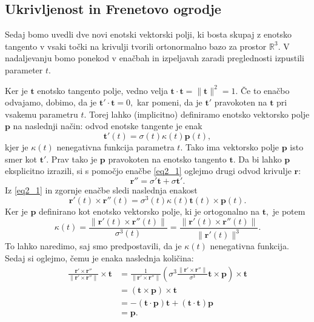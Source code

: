 \documentclass[12pt,a4paper,twoside]{article}
\theoremstyle{definition} %
\theoremstyle{plain} %
\theoremstyle{primerstyle}
\numberwithin{equation}{section}  %
\newcommand{\R}{\mathbb R}
\newcommand{\tV}{\mathbf{t}}
\newcommand{\pV}{\mathbf{p}}
\newcommand{\rV}{\mathbf{r}}
\begin{document}
\subsection{Ukrivljenost in Frenetovo ogrodje}

Sedaj bomo uvedli dve novi enotski vektorski polji, ki bosta skupaj z enotsko tangento v vsaki točki na krivulji tvorili ortonormalno bazo za prostor $\R^3.$ V nadaljevanju bomo ponekod v enačbah in izpeljavah zaradi preglednosti izpustili parameter $t.$

Ker je $\tV$ enotsko tangento polje, vedno velja $\tV \cdot \tV=\lVert \tV \rVert^2 =1.$ Če to enačbo odvajamo, dobimo, da je $\tV' \cdot \tV=0,$ kar pomeni, da je $\tV'$ pravokoten na $\tV$ pri vsakemu parametru $t.$ Torej lahko (implicitno) definiramo enotsko vektorsko polje $\pV$ na naslednji način: odvod enotske tangente je enak
\begin{equation}
	\label{eq2_5}
	\tV'(t)=\sigma(t)\kappa(t)\pV(t),
\end{equation}
kjer je $\kappa(t)$ nenegativna funkcija parametra $t.$ Tako ima vektorsko polje $\pV$ isto smer kot $\tV'.$ Prav tako je $\pV$ pravokoten na enotsko tangento $\tV.$ Da bi lahko $\pV$ eksplicitno izrazili, si s pomočjo enačbe \eqref{eq2_1} oglejmo drugi odvod krivulje $\rV:$
\begin{equation}
	\label{eq2_6}
	\rV''=\sigma'\tV+\sigma\tV'.
\end{equation}
Iz \eqref{eq2_1} in zgornje enačbe sledi naslednja enakost
\begin{equation}
	\label{eq2_7}
	\rV'(t) \times \rV''(t)=\sigma^3(t)\kappa(t)\tV(t) \times \pV(t).
\end{equation}
Ker je $\pV$ definirano kot enotsko vektorsko polje, ki je ortogonalno na $\tV,$ je potem
\begin{equation}
	\label{kappa1}
	\kappa(t)=\frac{\lVert \rV'(t) \times \rV''(t) \rVert}{\sigma^3(t)}=\frac{\lVert \rV'(t) \times \rV''(t) \rVert}{\lVert \rV'(t) \rVert^3}.
\end{equation}
To lahko naredimo, saj smo predpostavili, da je $\kappa(t)$ nenegativna funkcija. Sedaj si oglejmo, čemu je enaka naslednja količina:
\begin{align}
	\frac{\rV'\times \rV''}{\lVert \rV'\times \rV'' \rVert} \times \tV &= \frac{1}{\lVert \rV'\times \rV'' \rVert} \left ( \sigma^3 \frac{\lVert \rV'\times \rV'' \rVert}{\sigma^3}\tV \times \pV\right ) \times \tV \nonumber \\
	&= (\tV \times \pV) \times \tV \nonumber \\
	&= -(\tV \cdot \pV)\tV + (\tV \cdot \tV)\pV \nonumber \\
	&= \pV. \label{normala}
\end{align}
\end{document}
